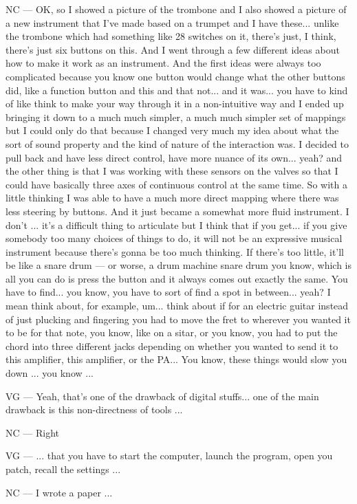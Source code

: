 NC — OK, so I showed a picture of the trombone and I also showed a picture of a new instrument that I've made based on a trumpet and I have these... unlike the trombone which had something like 28 switches on it, there's just, I think, there's just six buttons on this. And I went through a few different ideas about how to make it work as an instrument. And the first ideas were always too complicated because you know one button would change what the other buttons did, like a function button and this and that not... and it was... you have to kind of like think to make your way through it in a non-intuitive way and I ended up bringing it down to a much much simpler, a much much simpler set of mappings but I could only do that because I changed very much my idea about what the sort of sound property and the kind of nature of the interaction was. I decided to pull back and have less direct control, have more nuance of its own... yeah? and the other thing is that I was working with these sensors on the valves so that I could have basically three axes of continuous control at the same time. So with a little thinking I was able to have a much more direct mapping where there was less steering by buttons. And it just became a somewhat more fluid instrument. I don't ... it's a difficult thing to articulate but I think that if you get... if you give somebody too many choices of things to do, it will not be an expressive musical instrument because there's gonna be too much thinking. If there's too little, it'll be like a snare drum — or worse, a drum machine snare drum you know, which is all you can do is press the button and it always comes out exactly the same. You have to find... you know, you have to sort of find a spot in between... yeah? I mean think about,  for example, um...  think about if for an electric guitar instead of just plucking and fingering you had to move the fret to wherever you wanted it to be for that note, you know, like on a sitar, or you know, you had to put the chord into three different jacks depending on whether you wanted to send it to this amplifier, this amplifier, or the PA... You know, these things would slow you down ... you know ... 

VG — Yeah, that's one of the drawback of digital stuffs...  one of the main drawback is this non-directness of tools ...

NC — Right 

VG — ... that you have to start the computer, launch the program, open you patch, recall the settings ...

NC — I wrote a paper ... 

